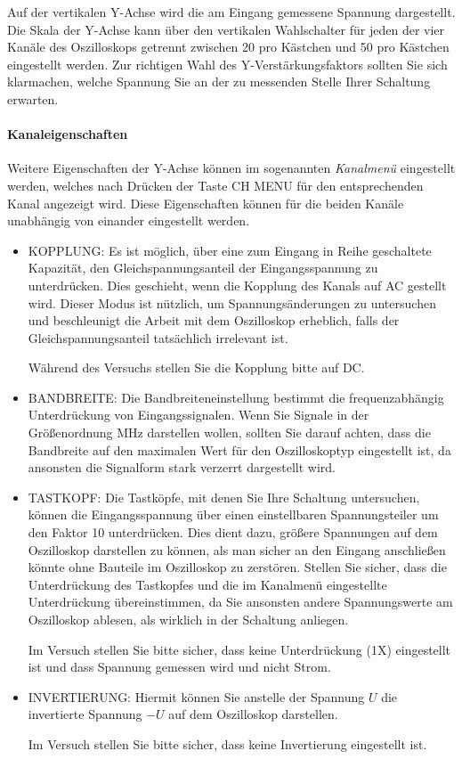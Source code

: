   Auf der vertikalen Y-Achse wird die am Eingang gemessene Spannung dargestellt. Die Skala der Y-Achse kann über den vertikalen Wahlschalter für jeden der vier Kanäle des Oszilloskops getrennt zwischen \unit{20}{\milli\volt} pro Kästchen und \unit{50}{\volt} pro Kästchen eingestellt werden. Zur richtigen Wahl des Y-Verstärkungsfaktors sollten Sie sich klarmachen, welche Spannung Sie an der zu messenden Stelle Ihrer Schaltung erwarten. 

  \paragraph{Kanaleigenschaften}
  Weitere Eigenschaften der Y-Achse können im sogenannten \textit{Kanalmenü} eingestellt werden, welches nach Drücken der Taste CH MENU für den entsprechenden Kanal angezeigt wird. Diese Eigenschaften können für die beiden Kanäle unabhängig von einander eingestellt werden. 
  \begin{itemize}
    \item KOPPLUNG: Es ist möglich, über eine zum Eingang in Reihe geschaltete Kapazität, den Gleichspannungsanteil der Eingangsspannung zu unterdrücken. Dies geschieht, wenn die Kopplung des Kanals auf AC gestellt wird. Dieser Modus ist nützlich, um Spannungsänderungen zu untersuchen und beschleunigt die Arbeit mit dem Oszilloskop erheblich,
      falls der Gleichspannungsanteil tatsächlich irrelevant ist.
      \begin{hint}
        Während des Versuchs stellen Sie die Kopplung bitte auf DC.
      \end{hint}

    \item BANDBREITE: Die Bandbreiteneinstellung bestimmt die frequenzabhängig Unterdrückung von Eingangssignalen. Wenn Sie Signale in der Größenordnung MHz darstellen wollen, sollten Sie darauf achten, dass die Bandbreite auf den maximalen Wert für den Oszilloskoptyp eingestellt ist, da ansonsten die Signalform stark verzerrt dargestellt wird.
    \item TASTKOPF: Die Tastköpfe, mit denen Sie Ihre Schaltung untersuchen, können die Eingangsspannung über einen einstellbaren Spannungsteiler um den Faktor 10 unterdrücken. Dies dient dazu, größere Spannungen auf dem Oszilloskop darstellen zu können, als man sicher an den Eingang anschließen könnte ohne Bauteile im Oszilloskop zu zerstören. 
    Stellen Sie sicher, dass die Unterdrückung des Tastkopfes und die im Kanalmenü eingestellte Unterdrückung übereinstimmen, da Sie ansonsten andere Spannungswerte am Oszilloskop ablesen, als wirklich in der Schaltung anliegen.
			\begin{hint}
				Im Versuch stellen Sie bitte sicher, dass keine Unterdrückung (1X) eingestellt ist und dass Spannung gemessen wird und nicht Strom.
			\end{hint}
    \item INVERTIERUNG: Hiermit können Sie anstelle der Spannung $U$ die invertierte Spannung $-U$ auf dem Oszilloskop darstellen. 
			\begin{hint}
				Im Versuch stellen Sie bitte sicher, dass keine Invertierung eingestellt ist.
			\end{hint}
  \end{itemize}

